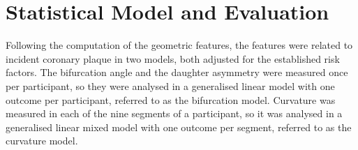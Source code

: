 \section{Statistical Model and Evaluation}
\label{sec:method-models}

Following the computation of the geometric features, the features were related to incident coronary plaque in two models, both adjusted for the established risk factors.
The bifurcation angle and the daughter asymmetry were measured once per participant, so they were analysed in a generalised linear model with one outcome per participant, referred to as the bifurcation model.
Curvature was measured in each of the nine segments of a participant, so it was analysed in a generalised linear mixed model with one outcome per segment, referred to as the curvature model.

